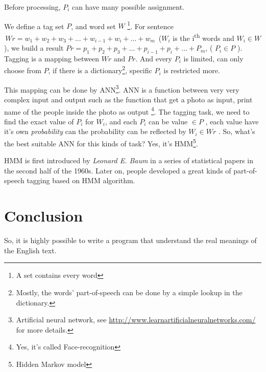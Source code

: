 Before processing, $P_i$ can have many possible assignment. 



We define a tag set $P$, and word set $ W $ \footnote{A set contains every word}.
For sentence  $ \, Wr = w_1 + w_2 + w_3 + \ldots + w_{i-1} + w_i  + \ldots + w_m  \, $  ($W_i$ is the i\textsuperscript{th} words and $W_i \in W $), 
	we build a result $ Pr = p_1 + p_2 + p_3 + \ldots + p_{i-1} + p_i + \ldots + P_m $, ( $ P_i \in P $ ).
Tagging is a mapping between $Wr$ and $Pr$.
And every $P_i$ is limited, can only choose from $P$, if there is a dictionary\footnote{Mostly, the words' part-of-speech can be done by a simple lookup in the dictionary.}, specific $P_i$ is restricted more.

This mapping can be done by ANN\footnote{Artificial neural network, see \url{http://www.learnartificialneuralnetworks.com/} for more details. }.
ANN is a function between very very complex input and output such as the function that get a photo as input, print name of the people inside the photo as output \footnote{Yes, it's called Face-recognition}.
The tagging task, we need to find the exact value of $P_i$ for $W_i$, and each $P_i$ can be value $ \in P $ ,  each value have it's own \emph{probability} can the probability can be reflected by $ W_i \in Wr $ . So, what's the best suitable ANN for this kinds of task? Yes, it's HMM\footnote{Hidden Markov model}{\citep{HMM_Based_Part_Of_Speech_Tagging}}.

HMM is first introduced by \emph{Leonard E. Baum} in a series of statistical papers in the second half of the 1960s. Later on, people developed a great kinds of part-of-speech tagging based on HMM algorithm. 



\section{Conclusion}

So, it is highly possible  to write a program that understand the real meanings of the English text.
